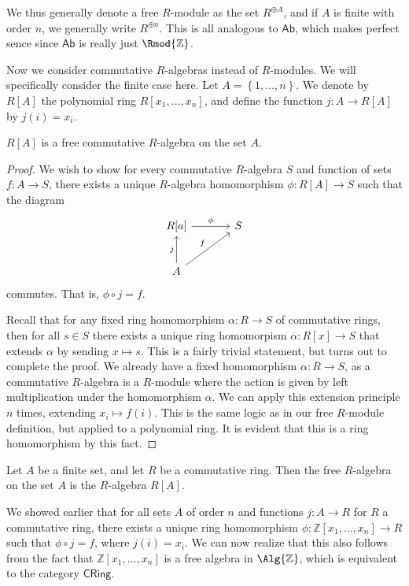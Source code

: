 We thus generally denote a free $R$-module as the set $R^{\oplus A}$, and if $A$ is finite with order $n$, we generally write $R^{\oplus n}$. This is all analogous to $\mathsf{Ab}$, which makes perfect sence since $\mathsf{Ab}$ is really just $\Rmod{\mathbb{Z}} $.

Now we consider commutative $R$-algebras instead of $R$-modules. We will specifically consider the finite case here. Let $A=\left\{ 1, \ldots, n \right\} $. We denote by $R[A]$ the polynomial ring $R[x_1, \dots, x_n ]$, and define the function $j : A \to R[A]$ by $j(i)=x_i$.
\begin{proposition}\label{prp:3.6.4}
	$R[A]$ is a free commutative $R$-algebra on the set $A$.
\end{proposition}
\begin{proof}
	We wish to show for every commutative $R$-algebra $S$ and function of sets $f : A \to S$, there exists a unique $R$-algebra homomorphism $\phi : R[A]\to S$ such that the diagram
	\[\begin{tikzcd}[row sep=2.5em, column sep=3.5em]
		R[a]\arrow[r, "\phi "]&S\\
		A\arrow[u, "j"]\arrow[ru, "f"]
	\end{tikzcd}\]
	commutes. That is, $\phi \circ j = f$.
	
	Recall that for any fixed ring homomorphism $\alpha : R \to S$ of commutative rings, then for all $s\in S$ there exists a unique ring homomorpism $\overline{\alpha } : R[x] \to S$ that extends $\alpha $ by sending $x\mapsto s$. This is a fairly trivial statement, but turns out to complete the proof. We already have a fixed homomorphism $\alpha : R \to S$, as a commutative $R$-algebra is a $R$-module where the action is given by left multiplication under the homomorphism $\alpha $. We can apply this extension principle $n$ times, extending $x_i \mapsto f(i)$. This is the same logic as in our free $R$-module definition, but applied to a polynomial ring. It is evident that this is a ring homomorphism by this fact.
\end{proof}

\begin{definition}\label{dfn:3.6.2}
	Let $A$ be a finite set, and let $R$ be a commutative ring. Then the free $R$-algebra on the set $A$ is the $R$-algebra $R[A]$.
\end{definition}

We showed earlier that for all sets $A$ of order $n$ and functions $j : A \to R$ for $R$ a commutative ring, there exists a unique ring homomorphism $\phi : \mathbb{Z}[x_1, \dots, x_n ] \to R$ such that $\phi \circ j=f$, where $j(i)=x_i$. We can now realize that this also follows from the fact that $\mathbb{Z}[x_1, \dots, x_n ]$ is a free algebra in $\Alg{\mathbb{Z}}$, which is equivalent to the category $\mathsf{CRing}$.

